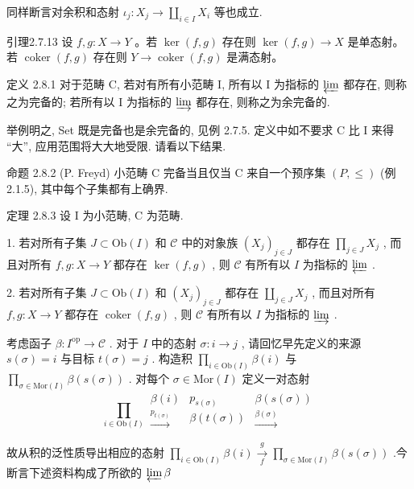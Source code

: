 \documentclass[]{article}
\begin{document}
同样断言对余积和态射 $\iota_{j}: X_{j} \to \coprod_{i \in I} X_{i}$ 等也成立. 

引理2.7.13 设 $f, g: X \to Y$ 。若 $\ker(f, g)$ 存在则 $\ker(f, g) \to X$ 是单态射。若 $\operatorname{coker}(f, g)$ 存在则 $Y \to \operatorname{coker}(f, g)$ 是满态射。 

定义 2.8.1 对于范畴 C, 若对有所有小范畴 I, 所有以 I 为指标的 $\varprojlim$ 都存在, 则称之为完备的; 若所有以 I 为指标的 $\varinjlim$ 都存在, 则称之为余完备的. 

举例明之, Set 既是完备也是余完备的, 见例 2.7.5. 定义中如不要求 C 比 I 来得 “大”, 应用范围将大大地受限. 请看以下结果. 

命题 2.8.2 (P. Freyd) 小范畴 C 完备当且仅当 C 来自一个预序集 $(P, \leq)$ (例 2.1.5), 其中每个子集都有上确界. 

定理 2.8.3 设 I 为小范畴, C 为范畴. 

1. 若对所有子集 $J \subset \mathrm{Ob}(I)$ 和 $\mathcal{C}$ 中的对象族 $(X_{j})_{j \in J}$ 都存在 $\prod_{j \in J} X_{j}$ , 而且对所有 $f, g: X \to Y$ 都存在 $\ker(f, g)$ , 则 $\mathcal{C}$ 有所有以 $I$ 为指标的 $\varprojlim$ . 

2. 若对所有子集 $J \subset \mathrm{Ob}(I)$ 和 $(X_{j})_{j \in J}$ 都存在 $\coprod_{j \in J} X_{j}$ , 而且对所有 $f, g: X \to Y$ 都存在 $\operatorname{coker}(f, g)$ , 则 $\mathcal{C}$ 有所有以 $I$ 为指标的 $\varinjlim$ . 

考虑函子 $\beta : I^{\mathrm{op}} \to \mathcal{C}$ . 对于 $I$ 中的态射 $\sigma : i \to j$ , 请回忆早先定义的来源 $s(\sigma) = i$ 与目标 $t(\sigma) = j$ . 构造积 $\prod_{i \in \mathrm{Ob}(I)} \beta(i)$ 与 $\prod_{\sigma \in \mathrm{Mor}(I)} \beta(s(\sigma))$ . 对每个 $\sigma \in \mathrm{Mor}(I)$ 定义一对态射  $$
\prod_ {i \in \mathrm{Ob} (I)} \begin{array}{c} \beta (i) \\ \xrightarrow {p _ {t (\sigma)}} \end{array} \begin{array}{c} p _ {s (\sigma)} \\ \beta (t (\sigma)) \end{array} \begin{array}{c} \beta (s (\sigma)) \\ \xrightarrow {\beta (\sigma)} \end{array}
$$

故从积的泛性质导出相应的态射 $\prod_{i\in \mathrm{Ob}(I)}\beta (i)\xrightarrow[f]{g}\prod_{\sigma \in \mathrm{Mor}(I)}\beta (s(\sigma))$ .今断言下述资料构成了所欲的 $\varprojlim \beta$ 
\end{document}

